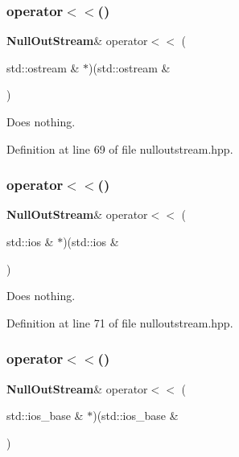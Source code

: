 \subsubsection{operator$<$$<$()\hspace{0.1cm}{\footnotesize\ttfamily [15/18]}}
{\footnotesize\ttfamily \textbf{ Null\+Out\+Stream}\& operator$<$$<$ (\begin{DoxyParamCaption}\item[{std\+::ostream \&}]{$\ast$)(std\+::ostream \& }\end{DoxyParamCaption})\hspace{0.3cm}{\ttfamily [inline]}}



Does nothing. 



Definition at line 69 of file nulloutstream.\+hpp.

\mbox{\label{classmlpack_1_1util_1_1NullOutStream_a2c7ecefcb7ff791a482d19190e47838a}} 
\subsubsection{operator$<$$<$()\hspace{0.1cm}{\footnotesize\ttfamily [16/18]}}
{\footnotesize\ttfamily \textbf{ Null\+Out\+Stream}\& operator$<$$<$ (\begin{DoxyParamCaption}\item[{std\+::ios \&}]{$\ast$)(std\+::ios \& }\end{DoxyParamCaption})\hspace{0.3cm}{\ttfamily [inline]}}



Does nothing. 



Definition at line 71 of file nulloutstream.\+hpp.

\mbox{\label{classmlpack_1_1util_1_1NullOutStream_ac3d0c1210e5c09e53c6a34bd25b8ee36}} 
\subsubsection{operator$<$$<$()\hspace{0.1cm}{\footnotesize\ttfamily [17/18]}}
{\footnotesize\ttfamily \textbf{ Null\+Out\+Stream}\& operator$<$$<$ (\begin{DoxyParamCaption}\item[{std\+::ios\+\_\+base \&}]{$\ast$)(std\+::ios\+\_\+base \& }\end{DoxyParamCaption})\hspace{0.3cm}{\ttfamily [inline]}}



